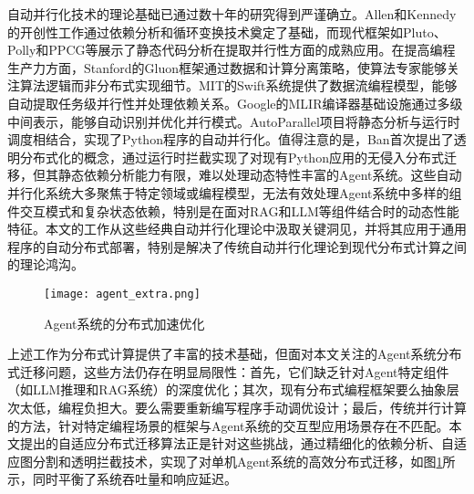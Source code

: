 自动并行化技术的理论基础已通过数十年的研究得到严谨确立。Allen和Kennedy\cite{10.5555/502981}的开创性工作通过依赖分析和循环变换技术奠定了基础，而现代框架如Pluto、Polly和PPCG等展示了静态代码分析在提取并行性方面的成熟应用。在提高编程生产力方面，Stanford的Gluon\cite{gluon2017}框架通过数据和计算分离策略，使算法专家能够关注算法逻辑而非分布式实现细节。MIT的Swift\cite{10.1145/2442516.2442559}系统提供了数据流编程模型，能够自动提取任务级并行性并处理依赖关系。Google的MLIR\cite{lattner2020mlircompilerinfrastructureend}编译器基础设施通过多级中间表示，能够自动识别并优化并行模式。AutoParallel\cite{ramoncortes2018autoparallelpythonmoduleautomatic}项目将静态分析与运行时调度相结合，实现了Python程序的自动并行化。值得注意的是，Ban首次提出了透明分布式化的概念\cite{10.5555/256664.256760}，通过运行时拦截实现了对现有Python应用的无侵入分布式迁移，但其静态依赖分析能力有限，难以处理动态特性丰富的Agent系统。这些自动并行化系统大多聚焦于特定领域或编程模型，无法有效处理Agent系统中多样的组件交互模式和复杂状态依赖，特别是在面对RAG和LLM等组件结合时的动态性能特征。本文的工作从这些经典自动并行化理论中汲取关键洞见，并将其应用于通用程序的自动分布式部署，特别是解决了传统自动并行化理论到现代分布式计算之间的理论鸿沟。

\begin{figure}[htbp]
    \centering
    \texttt{[image: agent\_extra.png]}
    \caption{Agent系统的分布式加速优化}
    \label{fig:accelerate_distributed}
\end{figure}

上述工作为分布式计算提供了丰富的技术基础，但面对本文关注的Agent系统分布式迁移问题，这些方法仍存在明显局限性：首先，它们缺乏针对Agent特定组件（如LLM推理和RAG系统）的深度优化；其次，现有分布式编程框架要么抽象层次太低，编程负担大。要么需要重新编写程序手动调优设计；最后，传统并行计算的方法，针对特定编程场景的框架与Agent系统的交互型应用场景存在不匹配。本文提出的自适应分布式迁移算法正是针对这些挑战，通过精细化的依赖分析、自适应图分割和透明拦截技术，实现了对单机Agent系统的高效分布式迁移，如图\ref{fig:accelerate_distributed}所示，同时平衡了系统吞吐量和响应延迟。

